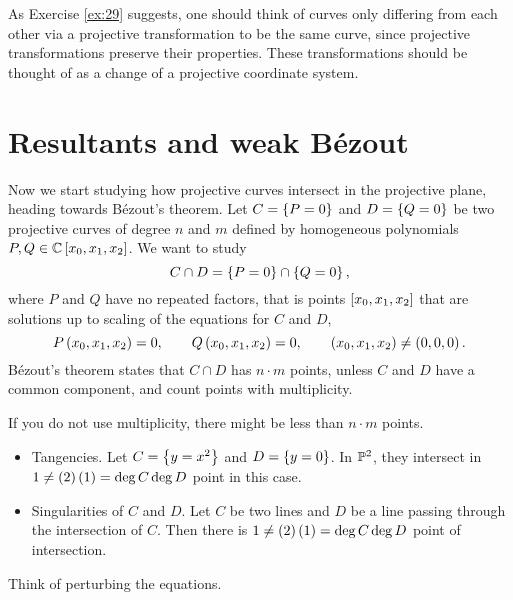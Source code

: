 \begin{remark}
As Exercise \ref{ex:29} suggests, one should think of curves only differing from each other via a projective transformation to be the same curve, since projective transformations preserve their properties. These transformations should be thought of as a change of a projective coordinate system.
\end{remark}

\pagebreak

\section{Resultants and weak B\'ezout}


Now we start studying how projective curves intersect in the projective plane, heading towards B\'ezout's theorem. Let $ C = \cbr{P = 0} $ and $ D = \cbr{Q = 0} $ be two projective curves of degree $ n $ and $ m $ defined by homogeneous polynomials $ P, Q \in \CC\sbr{x_0, x_1, x_2} $. We want to study
$$ C \cap D = \cbr{P = 0} \cap \cbr{Q = 0}, $$
where $ P $ and $ Q $ have no repeated factors, that is points $ \sbr{x_0, x_1, x_2} $ that are solutions up to scaling of the equations for $ C $ and $ D $,
$$ P\br{x_0, x_1, x_2} = 0, \qquad Q\br{x_0, x_1, x_2} = 0, \qquad \br{x_0, x_1, x_2} \ne \br{0, 0, 0}. $$
B\'ezout's theorem states that $ C \cap D $ has $ n \cdot m $ points, unless $ C $ and $ D $ have a common component, and count points with multiplicity.

\begin{example*}
If you do not use multiplicity, there might be less than $ n \cdot m $ points.
\begin{itemize}
\item Tangencies. Let $ C = \cbr{y = x^2} $ and $ D = \cbr{y = 0} $. In $ \mathbb{P}^2 $, they intersect in $ 1 \ne \br{2}\br{1} = \deg C\deg D $ point in this case.
\item Singularities of $ C $ and $ D $. Let $ C $ be two lines and $ D $ be a line passing through the intersection of $ C $. Then there is $ 1 \ne \br{2}\br{1} = \deg C\deg D $ point of intersection.
\end{itemize}
Think of perturbing the equations.
\end{example*}

